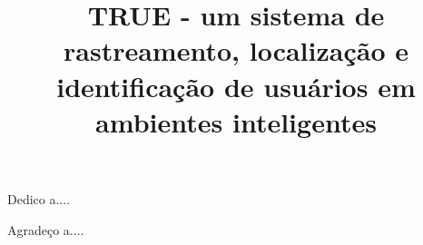 \documentclass[bacharelado]{unb-cic}
\title{TRUE - um sistema de rastreamento, localização e identificação de usuários em ambientes inteligentes}
\begin{document}
\maketitle
\pretextual
\begin{dedicatoria}
	Dedico a....
\end{dedicatoria}

\begin{agradecimentos}
	Agradeço a....
\end{agradecimentos}







\tableofcontents
\listoffigures
\listoftables

\textual





% 




\postextual




\end{document}
